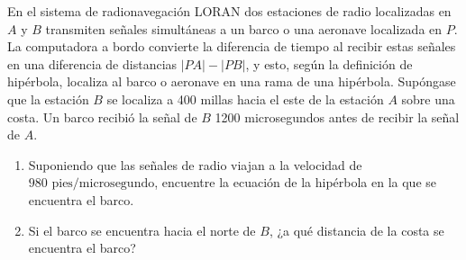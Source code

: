 \item En el sistema de radionavegación LORAN dos estaciones de radio localizadas en $A$ y $B$ transmiten señales simultáneas a un barco o una aeronave localizada en $P$. La computadora a bordo convierte la diferencia de tiempo al recibir estas señales en una diferencia de distancias $|PA| - |PB|$, y esto, según la definición de hipérbola, localiza al barco o aeronave en una rama de una hipérbola. Supóngase que la estación $B$ se localiza a 400 millas hacia el este de la estación $A$ sobre una costa. Un barco recibió la señal de $B$ 1200 microsegundos antes de recibir la señal de $A$.
    \begin{enumerate}
        \item[(a)] Suponiendo que las señales de radio viajan a la velocidad de $980 \text{ pies/microsegundo}$, encuentre la ecuación de la hipérbola en la que se encuentra el barco.
        \item[(b)] Si el barco se encuentra hacia el norte de $B$, ¿a qué distancia de la costa se encuentra el barco?
    \end{enumerate}
